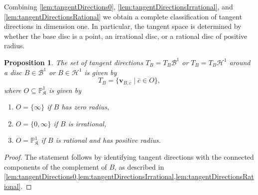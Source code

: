 \documentclass[10pt]{article}
\newtheorem{proposition}[theorem]{Proposition}
\theoremstyle{definition}
\newcommand{\PP}{\mathbb{P}}
\renewcommand{\vec}[1]{\mathbf{#1}}
\begin{document}
Combining \cref{lem:tangentDirections0}, \ref{lem:tangentDirectionsIrrational}, and \ref{lem:tangentDirectionsRational} we obtain a complete classification of tangent directions in dimension one. In particular, the tangent space is determined by whether the base disc is a point, an irrational disc, or a rational disc of positive radius.

\begin{proposition}
  \label{prop:tangentSpaceDisk}
  The set of tangent directions $T_B=T_B\mathcal B^1$ or $T_B=T_B\mathcal H^1$ around a disc $B\in \mathcal B^1$ or $B\in \mathcal H^1$ is given by
  \begin{equation*}
    \label{eq:tangentSpaceDisk}
    T_B = \{\vec{v}_{B,\bar c}\mid \bar c\in O \},
  \end{equation*}
  where $O\subseteq\PP_{\mathfrak K}^1$ is given by
  \begin{enumerate}
  \item[(i)] $O=\{\infty\}$ if $B$ has zero radius,
  \item[(ii)] $O=\{0,\infty\}$ if $B$ is irrational,
  \item[(iii)] $O=\PP_{\mathfrak K}^1$ if $B$ is rational and has positive radius.
  \end{enumerate}
\end{proposition}
\begin{proof}
  The statement follows by identifying tangent directions with the connected components of the complement of $B$, as described in \cref{lem:tangentDirections0,lem:tangentDirectionsIrrational,lem:tangentDirectionsRational}.
\end{proof}
\end{document}
